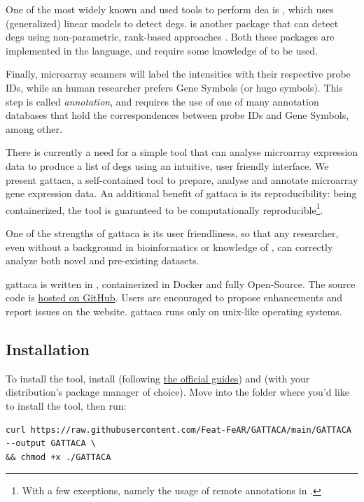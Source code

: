 One of the most widely known and used tools to perform \gls{dea} is , which uses (generalized) linear models to detect \glspl{deg}.  is another package that can detect \glspl{deg} using non-parametric, rank-based approaches \cite{hongRankProdBioconductorPackage2006}. Both these packages are implemented in the  language, and require some knowledge of  to be used.

Finally, microarray scanners will label the intensities with their respective probe IDs, while an human researcher prefers Gene Symbols (or \gls{hugo} symbols). This step is called \textit{annotation}, and requires the use of one of many annotation databases that hold the correspondences between probe IDs and Gene Symbols, among other.

There is currently a need for a simple tool that can analyse microarray expression data to produce a list of \glspl{deg} using an intuitive, user friendly interface. We present \gls{gattaca}, a self-contained tool to prepare, analyse and annotate microarray gene expression data. An additional benefit of \gls{gattaca} is its reproducibility: being containerized, the tool is guaranteed to be computationally reproducible\footnote{With a few exceptions, namely the usage of remote annotations in .}.

One of the strengths of \gls{gattaca} is its user friendliness, so that any researcher, even without a background in bioinformatics or knowledge of , can correctly analyze both novel and pre-existing datasets.

\gls{gattaca} is written in , containerized in Docker and fully Open-Source. The source code is \href{https://github.com/Feat-FeAR/GATTACA}{hosted on GitHub}. Users are encouraged to propose enhancements and report issues on the website. \gls{gattaca} runs only on unix-like operating systems.

\subsection{Installation}
To install the tool, install  (following \href{https://docs.docker.com/get-docker/}{the official guides}) and  (with your distribution's package manager of choice). Move into the folder where you'd like to install the tool, then run:

\begin{lstlisting}[style=ShellStyle]
curl https://raw.githubusercontent.com/Feat-FeAR/GATTACA/main/GATTACA --output GATTACA \
&& chmod +x ./GATTACA
\end{lstlisting}

